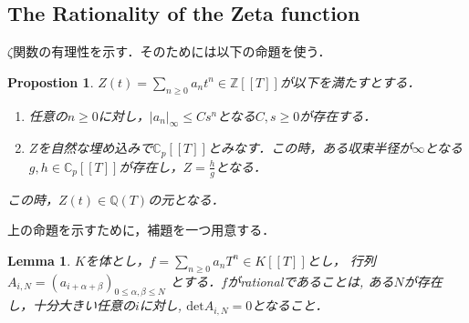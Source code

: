 \documentclass{ujarticle}
\newtheorem{prop}[thm]{Propostion}
\newtheorem{lem}[thm]{Lemma}
\begin{document}
\subsection{The Rationality of the Zeta function}
\label{sub:The Rationality of the Zeta function}
$\zeta$関数の有理性を示す．そのためには以下の命題を使う．
\begin{prop}
 $Z(t) = \sum_{n \ge 0}a_nt^n \in \mathbb{Z}[[T]]$が以下を満たすとする．
 \begin{enumerate}
   \item 任意の$n \ge 0$に対し，$| a_n|_{\infty} \le Cs^n$となる$C,s \ge 0$が存在する．
   \item $Z$を自然な埋め込みで$\mathbb{C}_p[[T]]$とみなす．この時，ある収束半径が$ \infty$となる$g,h \in \mathbb{C}_p[[T]]$が存在し，$ Z = \frac{h}{g}$となる．
 \end{enumerate}
 この時，$Z(t) \in \mathbb{Q}(T)$の元となる．
\end{prop}

上の命題を示すために，補題を一つ用意する．
\begin{lem}
$K$を体とし，$f　= \sum_{ n \ge 0 }a_nT^n　\in K[[T]]$とし，
行列$A_{i,N}=(a_{i + \alpha + \beta})_{0 \le \alpha,\beta \le N}$
とする．$f$がrationalであることは,
ある$N$が存在し，十分大きい任意の$i$に対し,
$\mathrm{det}A_{i,N}=0$となること．
\end{lem}
\end{document}
